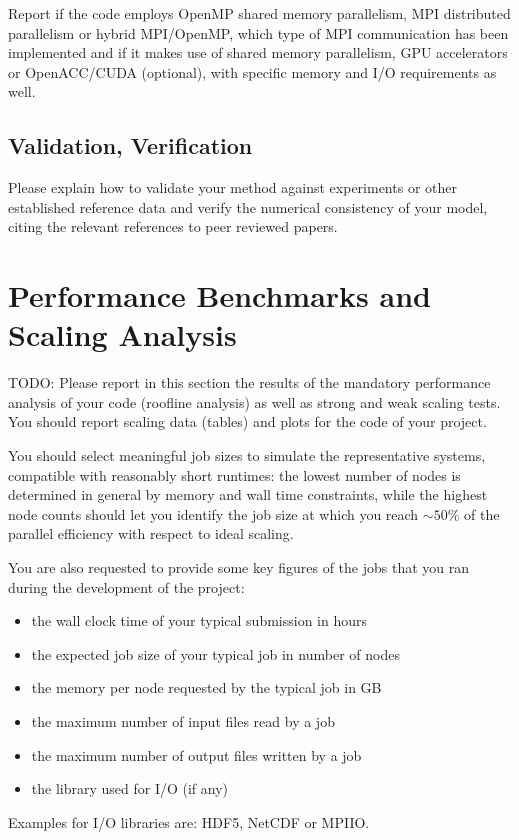 \documentclass[11pt]{article}
\begin{document}
  Report if the code employs OpenMP shared memory parallelism, MPI distributed
  parallelism or hybrid MPI/OpenMP, which type of MPI communication has been
  implemented and if it makes use of shared memory parallelism, GPU
  accelerators or OpenACC/CUDA (optional), with specific memory and I/O
  requirements as well.

  \subsection{Validation, Verification}

  Please explain how to validate your method against experiments or other
  established reference data and verify the numerical consistency of your
  model, citing the relevant references to peer reviewed papers.


\section{Performance Benchmarks and Scaling Analysis}

  TODO: Please report in this section the results of the mandatory performance
  analysis of your code (roofline analysis) as well as strong and weak scaling
  tests.  You should report scaling data (tables) and plots for the code of
  your project. 

  You should select meaningful job sizes to simulate the representative
  systems, compatible with reasonably short runtimes: the lowest number of
  nodes is determined in general by memory and wall time constraints, while the
  highest node counts should let you identify the job size at which you reach
  $\sim 50\%$ of the parallel efficiency with respect to ideal scaling.

  You are also requested to provide some key figures of the jobs that you 
  ran during the development of the project:
  \begin{itemize}
    \item the wall clock time of your typical submission in hours
    \item the expected job size of your typical job in number of nodes
    \item the memory per node requested by the typical job in GB
    \item the maximum number of input files read by a job
    \item the maximum number of output files written by a job
    \item the library used for I/O (if any)
  \end{itemize} 
  Examples for I/O libraries are: HDF5, NetCDF or MPIIO.
\end{document}
